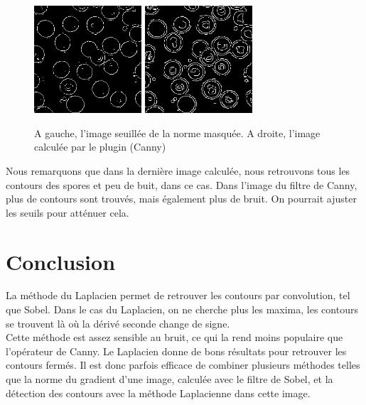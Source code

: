 \documentclass[a4paper,11pt]{article}
\begin{document}
  \begin{figure}[H]
   \center
   \includegraphics[width=4cm]{../result_laplacien.png}
   \includegraphics[width=4cm]{../canny.png}
   \caption{A gauche, l'image seuillée de la norme masquée. A droite, l'image calculée par le plugin (Canny)}
  \end{figure}
  
  Nous remarquons que dans la dernière image calculée, nous retrouvons tous les contours des spores et peu 
  de buit, dans ce cas. Dans l'image du filtre de Canny, plus de contours sont trouvés, mais également plus 
  de bruit. On pourrait ajuster les seuils pour atténuer cela.
  
  \section{Conclusion}
  La méthode du Laplacien permet de retrouver les contours par convolution, tel que Sobel. Dans le cas du Laplacien,
  on ne cherche plus les maxima, les contours se trouvent là où la dérivé seconde change de signe.\\
  
  Cette méthode est assez sensible au bruit, ce qui la rend moins populaire que l'opérateur de Canny. Le Laplacien 
  donne de bons résultats pour retrouver les contours fermés. Il est donc parfois efficace de combiner plusieurs
  méthodes telles que la norme du gradient d'une image, calculée avec le filtre de Sobel, et la détection des contours
  avec la méthode Laplacienne dans cette image.
\end{document}
